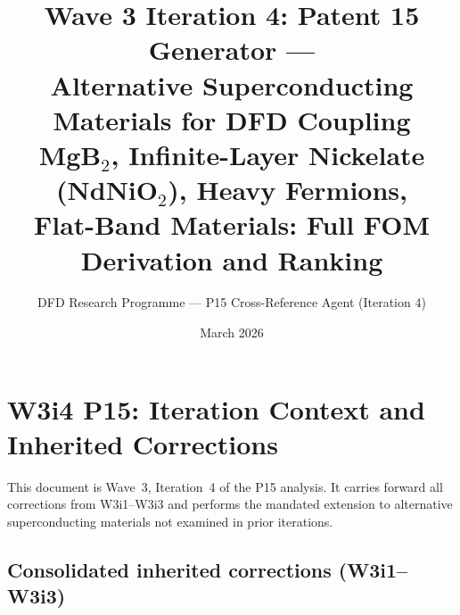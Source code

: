 \documentclass[11pt]{article}
\title{Wave 3 Iteration 4: Patent 15 Generator ---\\
Alternative Superconducting Materials for DFD Coupling\\
\large MgB$_2$, Infinite-Layer Nickelate (NdNiO$_2$), Heavy Fermions,\\
Flat-Band Materials: Full FOM Derivation and Ranking}
\author{DFD Research Programme --- P15 Cross-Reference Agent (Iteration 4)}
\date{March 2026}
\begin{document}
\maketitle
\tableofcontents
\newpage

\section{W3i4 P15: Iteration Context and Inherited Corrections}
\label{sec:context}

This document is Wave~3, Iteration~4 of the P15 analysis. It carries forward
all corrections from W3i1--W3i3 and performs the mandated extension to
alternative superconducting materials not examined in prior iterations.

\subsection{Consolidated inherited corrections (W3i1--W3i3)}
\end{document}
